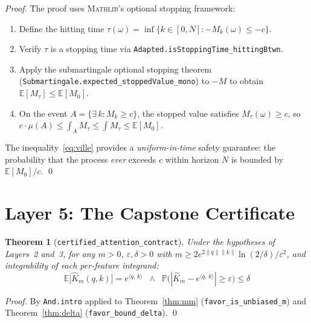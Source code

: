 \documentclass[11pt,a4paper,twocolumn]{article}
\newtheorem{theorem}{Theorem}[section]
\theoremstyle{definition}
\theoremstyle{remark}
\newcommand{\E}{\mathbb{E}}
\newcommand{\Prob}{\mathbb{P}}
\newcommand{\mathlib}{\textsc{Mathlib}}
\newcommand{\ip}[2]{\langle #1,\, #2 \rangle}
\newcommand{\leancode}[1]{\texttt{\color{leanblue}#1}}
\begin{document}
\begin{proof}
The proof uses \mathlib{}'s optional stopping framework:
\begin{enumerate}[nosep]
  \item Define the hitting time
        $\tau(\omega) = \inf\{k \in [0,N] : -M_k(\omega) \leq -c\}$.
  \item Verify $\tau$ is a stopping time via
        \leancode{Adapted.isStoppingTime\_hittingBtwn}.
  \item Apply the submartingale optional stopping theorem
        (\leancode{Submartingale.expected\_stoppedValue\_mono}) to $-M$ to
        obtain $\E[M_\tau] \leq \E[M_0]$.
  \item On the event $A = \{\exists\,k: M_k \geq c\}$, the stopped value
        satisfies $M_\tau(\omega) \geq c$, so
        $c \cdot \mu(A) \leq \int_A M_\tau \leq \int M_\tau \leq
        \E[M_0]$.
\end{enumerate}
The inequality~\eqref{eq:ville} provides a \emph{uniform-in-time} safety
guarantee: the probability that the process \emph{ever} exceeds $c$ within
horizon $N$ is bounded by $\E[M_0]/c$. \qed
\end{proof}


\section{Layer 5: The Capstone Certificate}
\label{sec:layer5}

\begin{theorem}[\leancode{certified\_attention\_contract}]
\label{thm:capstone}
Under the hypotheses of Layers~2 and~3, for any $m > 0$,
$\varepsilon, \delta > 0$ with
$m \geq 2e^{2\|q\|\|k\|}\ln(2/\delta)/\varepsilon^2$,
and integrability of each per-feature integrand:
\begin{equation}
  \boxed{
  \E\!\bigl[\hat{K}_m(q,k)\bigr] = e^{\ip{q}{k}}
  \;\;\wedge\;\;
  \Prob\!\bigl(|\hat{K}_m - e^{\ip{q}{k}}| \geq \varepsilon\bigr)
  \leq \delta
  }
\end{equation}
\end{theorem}

\begin{proof}
By \texttt{And.intro} applied to Theorem~\ref{thm:mm}
(\leancode{favor\_is\_unbiased\_m}) and Theorem~\ref{thm:delta}
(\leancode{favor\_bound\_delta}). \qed
\end{proof}


\end{document}
